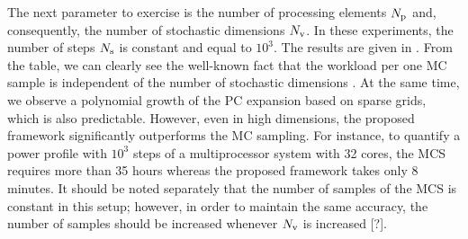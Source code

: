 
The next parameter to exercise is the number of processing elements ${N_\text{p}}$ and, consequently, the number of stochastic dimensions ${N_\text{v}}$. In these experiments, the number of steps $N_\text{s}$ is constant and equal to $10^3$. The results are given in . From the table, we can clearly see the well-known fact that the workload per one MC sample is independent of the number of stochastic dimensions \cite{maitre2010}. At the same time, we observe a polynomial growth \cite{heiss2008} of the PC expansion based on sparse grids, which is also predictable. However, even in high dimensions, the proposed framework significantly outperforms the MC sampling. For instance, to quantify a power profile with $10^3$ steps of a multiprocessor system with 32 cores, the MCS requires more than 35 hours whereas the proposed framework takes only 8 minutes. It should be noted separately that the number of samples of the MCS is constant in this setup; however, in order to maintain the same accuracy, the number of samples should be increased whenever ${N_\text{v}}$ is increased [?].
